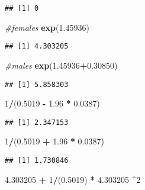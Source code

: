 \documentclass[]{article}
\newenvironment{Shaded}{\begin{snugshade}}{\end{snugshade}}
\newcommand{\KeywordTok}[1]{\textcolor[rgb]{0.13,0.29,0.53}{\textbf{#1}}}
\newcommand{\DecValTok}[1]{\textcolor[rgb]{0.00,0.00,0.81}{#1}}
\newcommand{\FloatTok}[1]{\textcolor[rgb]{0.00,0.00,0.81}{#1}}
\newcommand{\StringTok}[1]{\textcolor[rgb]{0.31,0.60,0.02}{#1}}
\newcommand{\CommentTok}[1]{\textcolor[rgb]{0.56,0.35,0.01}{\textit{#1}}}
\newcommand{\OperatorTok}[1]{\textcolor[rgb]{0.81,0.36,0.00}{\textbf{#1}}}
\newcommand{\NormalTok}[1]{#1}
\begin{document}
\begin{verbatim}
## [1] 0
\end{verbatim}

\begin{Shaded}
\begin{Highlighting}[]
\CommentTok{#females}
\KeywordTok{exp}\NormalTok{(}\FloatTok{1.45936}\NormalTok{)}
\end{Highlighting}
\end{Shaded}

\begin{verbatim}
## [1] 4.303205
\end{verbatim}

\begin{Shaded}
\begin{Highlighting}[]
\CommentTok{#males}
\KeywordTok{exp}\NormalTok{(}\FloatTok{1.45936}\OperatorTok{+}\FloatTok{0.30850}\NormalTok{)}
\end{Highlighting}
\end{Shaded}

\begin{verbatim}
## [1] 5.858303
\end{verbatim}

\begin{Shaded}
\begin{Highlighting}[]
\DecValTok{1}\OperatorTok{/}\NormalTok{(}\FloatTok{0.5019} \OperatorTok{-}\StringTok{ }\FloatTok{1.96} \OperatorTok{*}\StringTok{ }\FloatTok{0.0387}\NormalTok{)}
\end{Highlighting}
\end{Shaded}

\begin{verbatim}
## [1] 2.347153
\end{verbatim}

\begin{Shaded}
\begin{Highlighting}[]
\DecValTok{1}\OperatorTok{/}\NormalTok{(}\FloatTok{0.5019} \OperatorTok{+}\StringTok{ }\FloatTok{1.96} \OperatorTok{*}\StringTok{ }\FloatTok{0.0387}\NormalTok{)}
\end{Highlighting}
\end{Shaded}

\begin{verbatim}
## [1] 1.730846
\end{verbatim}

\begin{Shaded}
\begin{Highlighting}[]
\FloatTok{4.303205} \OperatorTok{+}\StringTok{ }\DecValTok{1}\OperatorTok{/}\NormalTok{(}\FloatTok{0.5019}\NormalTok{) }\OperatorTok{*}\StringTok{ }\FloatTok{4.303205} \OperatorTok{^}\DecValTok{2}
\end{Highlighting}
\end{Shaded}
\end{document}
